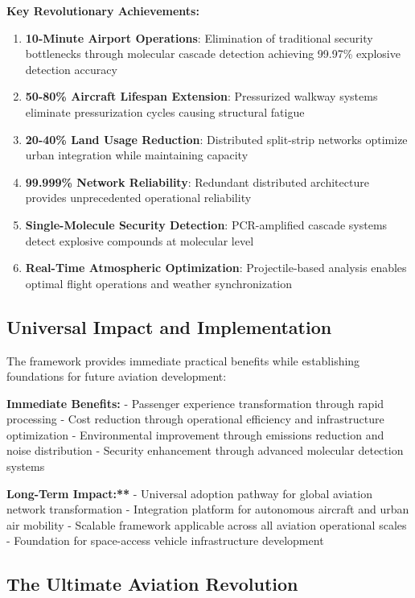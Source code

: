 \documentclass[12pt,a4paper]{article}
\begin{document}
\textbf{Key Revolutionary Achievements:}
\begin{enumerate}
\item \textbf{10-Minute Airport Operations}: Elimination of traditional security bottlenecks through molecular cascade detection achieving 99.97\% explosive detection accuracy
\item \textbf{50-80\% Aircraft Lifespan Extension}: Pressurized walkway systems eliminate pressurization cycles causing structural fatigue
\item \textbf{20-40\% Land Usage Reduction}: Distributed split-strip networks optimize urban integration while maintaining capacity
\item \textbf{99.999\% Network Reliability}: Redundant distributed architecture provides unprecedented operational reliability
\item \textbf{Single-Molecule Security Detection}: PCR-amplified cascade systems detect explosive compounds at molecular level
\item \textbf{Real-Time Atmospheric Optimization}: Projectile-based analysis enables optimal flight operations and weather synchronization
\end{enumerate}

\subsection{Universal Impact and Implementation}

The framework provides immediate practical benefits while establishing foundations for future aviation development:

\textbf{Immediate Benefits:}
- Passenger experience transformation through rapid processing
- Cost reduction through operational efficiency and infrastructure optimization  
- Environmental improvement through emissions reduction and noise distribution
- Security enhancement through advanced molecular detection systems

\textbf{Long-Term Impact:**}
- Universal adoption pathway for global aviation network transformation
- Integration platform for autonomous aircraft and urban air mobility
- Scalable framework applicable across all aviation operational scales
- Foundation for space-access vehicle infrastructure development

\subsection{The Ultimate Aviation Revolution}
\end{document}
